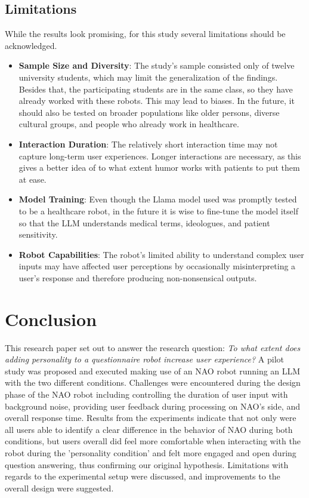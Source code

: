 \documentclass[runningheads]{llncs}
\begin{document}
\subsection{Limitations}
While the results look promising, for this study several limitations should be acknowledged.

\begin{itemize}
    \item \textbf{Sample Size and Diversity}: The study's sample consisted only of twelve university students, which may limit the generalization of the findings. Besides that, the participating students are in the same class, so they have already worked with these robots. This may lead to biases. In the future, it should also be tested on broader populations like older persons, diverse cultural groups, and people who already work in healthcare.
    \item \textbf{Interaction Duration}: The relatively short interaction time may not capture long-term user experiences. Longer interactions are necessary, as this gives a better idea of to what extent humor works with patients to put them at ease.
    \item \textbf{Model Training}: Even though the Llama model used was promptly tested to be a healthcare robot, in the future it is wise to fine-tune the model itself so that the LLM understands medical terms, ideologues, and patient sensitivity.
    \item \textbf{Robot Capabilities}: The robot's limited ability to understand complex user inputs may have affected user perceptions by occasionally misinterpreting a user's response and therefore producing non-nonsensical outputs.
\end{itemize}

\section{Conclusion}
This research paper set out to answer the research question: \textit{To what extent does adding personality to a questionnaire robot increase user experience?} A pilot study was proposed and executed making use of an NAO robot running an LLM with the two different conditions. Challenges were encountered during the design phase of the NAO robot including controlling the duration of user input with background noise, providing user feedback during processing on NAO's side, and overall response time. Results from the experiments indicate that not only were all users able to identify a clear difference in the behavior of NAO during both conditions, but users overall did feel more comfortable when interacting with the robot during the 'personality condition' and felt more engaged and open during question answering, thus confirming our original hypothesis. Limitations with regards to the experimental setup were discussed, and improvements to the overall design were suggested.
\end{document}
